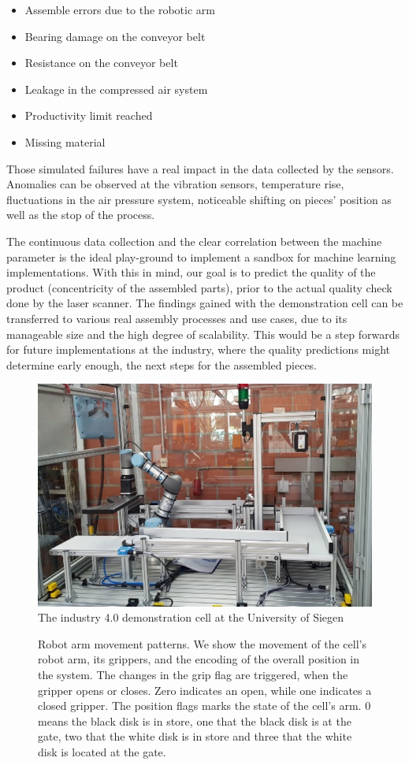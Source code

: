 \documentclass[5p,times,procedia]{elsarticle}
\begin{document}
\begin{itemize}
       \item Assemble errors due to the robotic arm
       \item Bearing damage on the conveyor belt
       \item Resistance on the conveyor belt
       \item Leakage in the compressed air system
       \item Productivity limit reached
       \item Missing material
\end{itemize}

Those simulated failures have a real impact in the data collected by the sensors. Anomalies can be observed at the vibration sensors, temperature rise, fluctuations in the air pressure system, noticeable shifting on pieces' position as well as the stop of the process.

The continuous data collection and the clear correlation between the machine parameter is the ideal play-ground to implement a sandbox for machine learning implementations. With this in mind, our goal is to predict the quality of the product (concentricity of the assembled parts), prior to the actual quality check done by the laser scanner. The findings gained with the demonstration cell can be transferred to various real assembly processes and use cases, due to its manageable size and the high degree of scalability. This would be a step forwards for future implementations at the industry, where the quality predictions might determine early enough, the next steps for the assembled pieces.


\begin{figure}
       \includegraphics[width=.45\textwidth]{img/demozelle}
       \caption{The industry 4.0 demonstration cell at the University of Siegen}
\label{fig:ind_cell}
\end{figure}

\begin{figure}
       
       \caption{Robot arm movement patterns. We show the movement of the 
                cell's robot arm, its grippers, and the encoding of the overall
                position in the system. The changes in the grip flag are triggered,
                when the gripper opens or closes. Zero indicates an open, while
                one indicates a closed gripper. The position flags marks the state
                of the cell's arm. 0 means the black disk is in store,
                one that the black disk is at the gate, two that the white disk
                is in store and three that the white disk is located at the gate.
             }
\label{fig:robot_pos_cell}
\end{figure}
\end{document}
